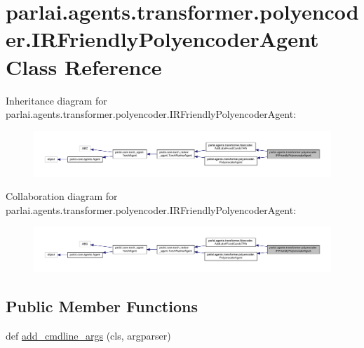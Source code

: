\hypertarget{classparlai_1_1agents_1_1transformer_1_1polyencoder_1_1IRFriendlyPolyencoderAgent}{}\section{parlai.\+agents.\+transformer.\+polyencoder.\+I\+R\+Friendly\+Polyencoder\+Agent Class Reference}
\label{classparlai_1_1agents_1_1transformer_1_1polyencoder_1_1IRFriendlyPolyencoderAgent}


Inheritance diagram for parlai.\+agents.\+transformer.\+polyencoder.\+I\+R\+Friendly\+Polyencoder\+Agent\+:\nopagebreak
\begin{figure}[H]
\begin{center}
\leavevmode
\includegraphics[width=350pt]{df/d4d/classparlai_1_1agents_1_1transformer_1_1polyencoder_1_1IRFriendlyPolyencoderAgent__inherit__graph}
\end{center}
\end{figure}


Collaboration diagram for parlai.\+agents.\+transformer.\+polyencoder.\+I\+R\+Friendly\+Polyencoder\+Agent\+:
\nopagebreak
\begin{figure}[H]
\begin{center}
\leavevmode
\includegraphics[width=350pt]{d1/d87/classparlai_1_1agents_1_1transformer_1_1polyencoder_1_1IRFriendlyPolyencoderAgent__coll__graph}
\end{center}
\end{figure}
\subsection*{Public Member Functions}
\begin{DoxyCompactItemize}
\item 
def \hyperlink{classparlai_1_1agents_1_1transformer_1_1polyencoder_1_1IRFriendlyPolyencoderAgent_afbf30376e853d1a5f9a52b1ae3453aa2}{add\+\_\+cmdline\+\_\+args} (cls, argparser)
\end{DoxyCompactItemize}
